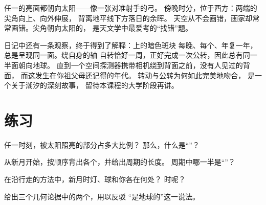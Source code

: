 \begin{example}[蛾眉月的尖角指向何方？]\label{ex:g7:moon-phases:points}
任一的亮面都朝向太阳——像一张对准射手的弓。
傍晚时分，位于西方：两端的尖角向上、向外伸展，
背离地平线下方落日的余晖。
天空从不会画错，画家却常常画错。尖角朝向太阳的，
是天文学中最爱考的“找错”题。
\end{example}

\begin{remark}[那张永不转开的脸]\label{rem:g7:moon-phases:sameface}
日记中还有一条观察，终于得到了解释：上的暗色斑块
每晚、每个、年复一年，总是呈现同一面。绕自身的轴
自转恰好一周，正好完成一次公转，因此总有同一半面朝向地球。
直到一个空间探测器携带相机绕到背面之前，没有人见过的背面，
而这发生在你祖父母还记得的年代。
转动与公转为何如此完美地吻合，
是一个关于潮汐的深刻故事，
留待本课程的大学阶段再讲。
\end{remark}

\section{练习}

\begin{exercise}[$\star$]\label{exo:g7:moon-phases:1}
任一时刻，被太阳照亮的部分占多大比例？
那么，什么是“”？
\end{exercise}

\begin{exercise}[$\star$]\label{exo:g7:moon-phases:2}
从新月开始，按顺序背出各个，并给出周期的长度。
周期中哪一半是“”？
\end{exercise}

\begin{exercise}[$\star$]\label{exo:g7:moon-phases:3}
在沿行走的方法中，新月时灯、球和你各在何处？
时呢？
\end{exercise}

\begin{exercise}[$\star$]\label{exo:g7:moon-phases:4}
给出三个几何论据中的两个，用以反驳
“是地球的”这一说法。
\end{exercise}

